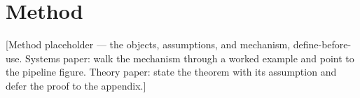 \section{Method}
\label{sec:method}
[Method placeholder — the objects, assumptions, and mechanism, define-before-use. Systems paper: walk the
mechanism through a worked example and point to the pipeline figure. Theory paper: state the theorem with
its assumption and defer the proof to the appendix.]
